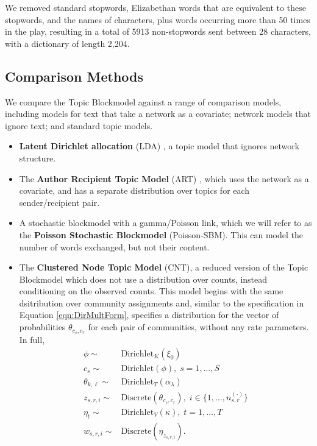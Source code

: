             We removed standard stopwords, Elizabethan words that are equivalent to these stopwords, and the names of characters, plus words occurring more than 50 times in the play, resulting in a total of 5913 non-stopwords sent between 28 characters, with a dictionary of length 2,204. 
        
    \subsection{Comparison Methods}\label{sec:comparisons}
    
        We compare the Topic Blockmodel against a range of comparison models, including models for text that take a network as a covariate; network models that ignore text; and standard topic models. 

        \begin{itemize}
            \item \textbf{Latent Dirichlet allocation} (LDA) \citep{blei2003LDA}, a topic model that ignores network structure.
            \item The \textbf{Author Recipient Topic Model} (ART) \citep{mccallum2005}, which uses the network as a covariate, and has a separate distribution over topics for each sender/recipient pair. 
            \item A stochastic blockmodel with a gamma/Poisson link, which we will refer to as the \textbf{Poisson Stochastic Blockmodel} (Poisson-SBM). This can model the number of words exchanged, but not their content.
            \item The \textbf{Clustered Node Topic Model} (CNT), a reduced version of the Topic Blockmodel which does not use a distribution over counts, instead conditioning on the observed counts.  This model begins with the same dsitribution over community assignments and, similar to the specification in Equation \ref{eqn:DirMultForm}, specifies a distribution for the vector of probabilities $\theta_{c_s,c_r}$ for each pair of communities, without any rate parameters.  In full,
            \begin{equation}
              \begin{aligned}
                \phi \sim& \mbox{Dirichlet}_K(\xi_0)\\
                c_s \sim& \mbox{Dirichlet}(\phi),\; s=1,\dots,S\\
                \theta_{k,\ell} \sim& \mbox{Dirichlet}_T(\alpha_\lambda)\\
                z_{s,r,i} \sim& \mbox{Discrete}(\theta_{c_s,c_r}),\; i\in\{1,\dots, n_{s,r}^{(\cdot)}\}\\
                \eta_t \sim& \mbox{Dirichlet}_V(\kappa),\; t=1,\dots,T\\
                w_{s,r,i} \sim& \mbox{Discrete}(\eta_{z_{s,r,i}}).
              \end{aligned}\label{eqn:CNTModel}
            \end{equation}
        \end{itemize}
        
